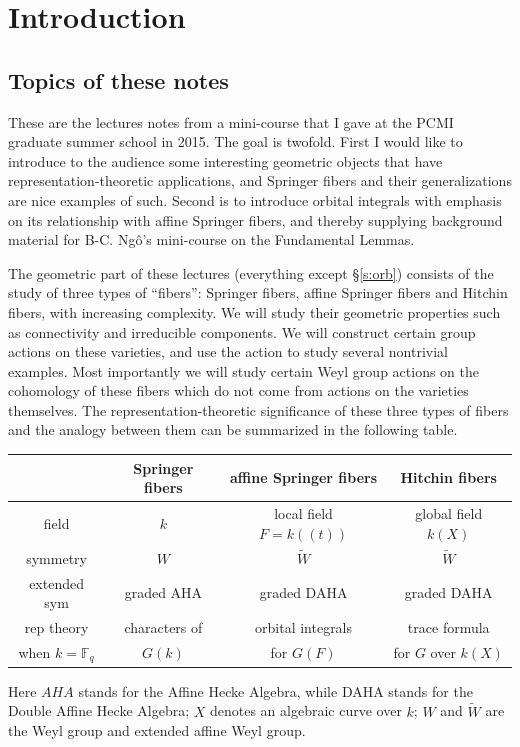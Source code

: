 \documentclass[]{pcmi}
\theoremstyle{plain}
\theoremstyle{definition}
\def\FF{\mathbb{F}}
\newcommand\tilW{\widetilde{W}}
\newcommand{\lr}[1]{(\!(#1)\!)}
\begin{document}
\tableofcontents

%    
%    

\section{Introduction}

\subsection{Topics of these notes} These are the lectures notes from a mini-course that I gave at the PCMI graduate summer school in 2015. The goal is twofold. First I would like to introduce to the audience some interesting geometric objects that have representation-theoretic applications, and Springer fibers and their generalizations are nice examples of such. Second is to introduce orbital integrals with emphasis on its relationship with affine Springer fibers, and thereby supplying background material for B-C. Ng\^o's mini-course on the Fundamental Lemmas.

The geometric part of these lectures (everything except \S\ref{s:orb}) consists of the study of three types of ``fibers'': Springer fibers, affine Springer fibers and Hitchin fibers, with increasing complexity. We will study their geometric properties such as connectivity and irreducible components. We will construct certain group actions on these varieties, and use the action to study several nontrivial examples. Most importantly we will study certain Weyl group actions on the cohomology of these fibers which do not come from actions on the varieties themselves. The representation-theoretic significance of these three types of fibers and the analogy between them can be summarized in the following table.

\begin{table}
	\centering
		\begin{tabular}{|c|c|c|c|}
		\hline
		& Springer fibers & affine  Springer fibers & Hitchin fibers\\
		\hline
		field & $k$ & local field $F=k\lr{t}$ & global field $k(X)$\\
		\hline
		symmetry & $W$ & $\tilW$ &  $\tilW$\\
		\hline
		extended sym& graded AHA & graded DAHA & graded DAHA\\
		\hline
		rep theory & characters of  & orbital integrals &  trace formula \\
		when $k=\FF_{q}$ & $G(k)$ & for $G(F)$ & for $G$ over $k(X)$\\
		\hline
		\end{tabular}
\end{table}
Here $AHA$ stands for the Affine Hecke Algebra, while DAHA stands for the Double Affine Hecke Algebra; $X$ denotes an algebraic curve over $k$; $W$ and $\tilW$ are the Weyl group and extended affine Weyl group. 
\end{document}
